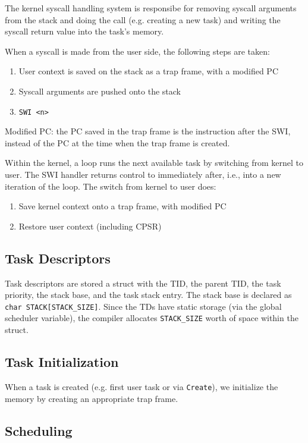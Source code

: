 \documentclass{article}
\begin{document}
The kernel syscall handling system is responsibe for removing syscall arguments from the stack and doing the call (e.g. creating a new task) and writing the syscall return value into the task's memory.

When a syscall is made from the user side, the following steps are taken:

\begin{enumerate}
\item User context is saved on the stack as a trap frame, with a modified PC
\item Syscall arguments are pushed onto the stack
\item \texttt{SWI <n>}
\end{enumerate}

Modified PC: the PC saved in the trap frame is the instruction after the SWI, instead of the PC at the time when the trap frame is created.

Within the kernel, a loop runs the next available task by switching from kernel to user. The SWI handler returns control to immediately after, i.e., into a new iteration of the loop. The switch from kernel to user does:

\begin{enumerate}
\item Save kernel context onto a trap frame, with modified PC
\item Restore user context (including CPSR)
\end{enumerate}

\subsection*{Task Descriptors}

Task descriptors are stored a struct with the TID, the parent TID, the task priority, the stack base, and the task stack entry. The stack base is declared as \texttt{char STACK[STACK\_SIZE]}. Since the TDs have static storage (via the global scheduler variable), the compiler allocates \texttt{STACK\_SIZE} worth of space within the struct.

\subsection*{Task Initialization}

When a task is created (e.g. first user task or via \texttt{Create}), we initialize the memory by creating an appropriate trap frame.

\subsection*{Scheduling}
\end{document}

